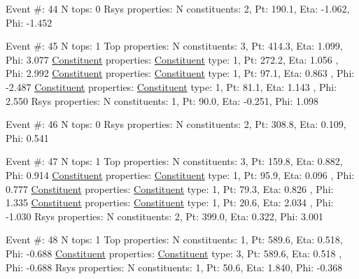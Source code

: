 \begin{DoxyCode}
Event #: 44
      N tops: 0
      Rsys properties: N constituents:   2,   Pt:  190.1,   Eta:  -1.062,   Phi:  -1.452

Event #: 45
      N tops: 1
      Top properties: N constituents:   3,   Pt:  414.3,   Eta:   1.099,   Phi:   3.077
          \hyperlink{classConstituent}{Constituent} properties: \hyperlink{classConstituent}{Constituent} type:   1,   Pt:  272.2,   Eta:   1.056
      ,   Phi:   2.992
          \hyperlink{classConstituent}{Constituent} properties: \hyperlink{classConstituent}{Constituent} type:   1,   Pt:   97.1,   Eta:   0.863
      ,   Phi:  -2.487
          \hyperlink{classConstituent}{Constituent} properties: \hyperlink{classConstituent}{Constituent} type:   1,   Pt:   81.1,   Eta:   1.143
      ,   Phi:   2.550
      Rsys properties: N constituents:   1,   Pt:   90.0,   Eta:  -0.251,   Phi:   1.098

Event #: 46
      N tops: 0
      Rsys properties: N constituents:   2,   Pt:  308.8,   Eta:   0.109,   Phi:   0.541

Event #: 47
      N tops: 1
      Top properties: N constituents:   3,   Pt:  159.8,   Eta:   0.882,   Phi:   0.914
          \hyperlink{classConstituent}{Constituent} properties: \hyperlink{classConstituent}{Constituent} type:   1,   Pt:   95.9,   Eta:   0.096
      ,   Phi:   0.777
          \hyperlink{classConstituent}{Constituent} properties: \hyperlink{classConstituent}{Constituent} type:   1,   Pt:   79.3,   Eta:   0.826
      ,   Phi:   1.335
          \hyperlink{classConstituent}{Constituent} properties: \hyperlink{classConstituent}{Constituent} type:   1,   Pt:   20.6,   Eta:   2.034
      ,   Phi:  -1.030
      Rsys properties: N constituents:   2,   Pt:  399.0,   Eta:   0.322,   Phi:   3.001

Event #: 48
      N tops: 1
      Top properties: N constituents:   1,   Pt:  589.6,   Eta:   0.518,   Phi:  -0.688
          \hyperlink{classConstituent}{Constituent} properties: \hyperlink{classConstituent}{Constituent} type:   3,   Pt:  589.6,   Eta:   0.518
      ,   Phi:  -0.688
      Rsys properties: N constituents:   1,   Pt:   50.6,   Eta:   1.840,   Phi:  -0.368


\end{DoxyCode}
